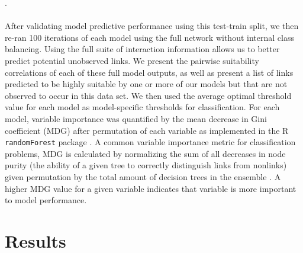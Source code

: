 \documentclass[num-refs]{article}%
\providecommand{\DIFaddend}{} %
\DeclareRobustCommand{\DIFaddend}{\DIFOaddend \let\includegraphics\DIFOincludegraphics} %
\begin{document}
{{\citep{holm1979simple}}\hspace{0pt}%
. 
}\DIFaddend 

\paragraph{}
After validating model predictive performance using this test-train split, we then re-ran 100 iterations of each model using the full network without internal class balancing. Using the full suite of interaction information allows us to better predict potential unobserved links. We present the pairwise suitability correlations of each of these full model outputs, as well as present a list of links predicted to be highly suitable by one or more of our models but that are not observed to occur in this data set. We then used the average optimal threshold value for each model as model-specific thresholds for classification. For each model, variable importance was quantified by the mean decrease in Gini coefficient (MDG) after permutation of each variable as implemented in the R \texttt{randomForest} package \citep{randomForest}. A common variable importance metric for classification problems, MDG is calculated by normalizing the sum of all decreases in node purity (the ability of a given tree to correctly distinguish links from nonlinks) given permutation by the total amount of decision trees in the ensemble \citep{calle2011stability, khalilia2011predicting}. A higher MDG value for a given variable indicates that variable is more important to model performance. 






\section*{Results}
\end{document}
